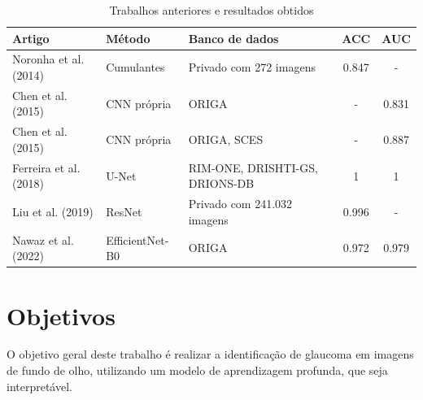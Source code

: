 \documentclass[12pt]{article}
\begin{document}
\begin{table}[htb]
    \centering
    \begin{tabular}{|l|l|p{3cm}|c|c|}
    \hline
    Artigo                                      & Método      & Banco de dados                 & ACC   & AUC   \\
    \hline
    Noronha et al. (2014) \cite{noronha2014hoc} & Cumulantes  & Privado com 272 imagens          & 0.847 &  -    \\
    \hline
    Chen et al. (2015) \cite{chen2015cnn}       & CNN própria & ORIGA                          & -     & 0.831 \\
    \hline
    Chen et al. (2015) \cite{chen2015cnn}       & CNN própria & ORIGA, SCES                    & -     & 0.887 \\
    \hline
    Ferreira et al. (2018) \cite{ferreira_cnn_2018} & U-Net   & RIM-ONE, DRISHTI-GS, DRIONS-DB & 1     & 1     \\  
    \hline
    Liu et al. (2019) \cite{liu_cnn_2019}       & ResNet      & Privado com 241.032 imagens & 0.996 & -     \\
    \hline
    Nawaz et al. (2022) \cite{nawaz_efficient_2022} & EfficientNet-B0 & ORIGA                  & 0.972 & 0.979 \\
    \hline
    \end{tabular}
    \caption{Trabalhos anteriores e resultados obtidos}
    \label{tab:trabalhos}
\end{table}

\bigskip

\section{Objetivos}
\label{sec:objetivo}

O objetivo geral deste trabalho é realizar a identificação de glaucoma em imagens de fundo de olho, utilizando um modelo de aprendizagem profunda, que seja interpretável.
\end{document}
